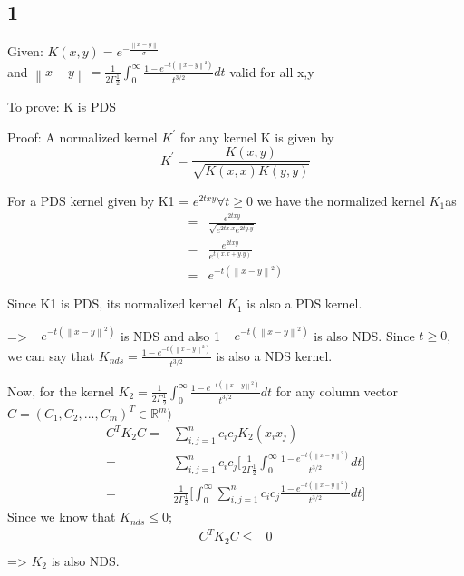 \documentclass{article}
\begin{document}
\subsection*{1}
\begin{description}
  \item{Given:} \( K(x,y) = e^{-\frac{ \left\lVert x - y \right\rVert }{\sigma}} \) \\
    and \( \left\lVert x - y \right\rVert  = \frac{1}{2\Gamma{\frac{1}{2}}} \int_{0}^{\infty} \frac{1 - e^{-t(\left\lVert x - y \right\rVert^{2})} }{ t^{3/2}} dt \) valid for all x,y
  \item{To prove:} K is PDS
  \item{Proof:}
    A normalized kernel $K^{'}$ for any kernel K is given by
    \begin{equation*}
      K^{'} = \frac{K(x,y)}{\sqrt{K(x,x) K(y,y)}}
    \end{equation*}

    For a PDS kernel given by K1 = $e^{2txy} \forall t \ge 0$ we have the normalized kernel $K_{1}$as 
    \begin{align}
      =& \frac{e^{2txy}}{\sqrt{e^{2tx.x}e^{2ty.y}}} \\
      =& \frac{e^{2txy}}{e^{t(x.x + y.y)}} \\
      =& e^{-t(\left\lVert x - y \right\rVert^{2})}
    \end{align}

    Since K1 is PDS, its normalized kernel $K_{1} $ is also a PDS kernel.

    => $-e^{-t(\left\lVert x - y \right\rVert^{2})}$ is NDS and also 1 $-e^{-t(\left\lVert x - y \right\rVert^{2})}$ is also NDS.  Since $ t \ge 0$, we can say that $ K_{nds} = \frac{1 - e^{-t(\left\lVert x - y \right\rVert^{2})}}{t^{3/2}}$ is also a NDS kernel.

    Now, for the kernel $K_{2} = \frac{1}{2\Gamma{\frac{1}{2}}} \int_{0}^{\infty} \frac{1 - e^{-t(\left\lVert x - y \right\rVert^{2})} }{ t^{3/2}} dt$
    for any column vector \( C = (C_{1}, C_{2}, ...  ,C_{m})^{T} \in \mathbb{R}^{m} ) \)
    \begin{align*}
      C^{T}K_{2}C =& \sum_{i,j=1}^{n} c_{i}c_{j} K_{2}(x_{i}x_{j}) \\
      =& \sum_{i,j=1}^{n} c_{i}c_{j} \bigl[ \frac{1}{2\Gamma{\frac{1}{2}}} \int_{0}^{\infty} \frac{1 - e^{-t(\left\lVert x - y \right\rVert^{2})} }{ t^{3/2}} dt \bigr] \\
      =& \frac{1}{2\Gamma{\frac{1}{2}}} \bigl[ \int_{0}^{\infty} \sum_{i,j=1}^{n} c_{i}c_{j} \frac{1 - e^{-t(\left\lVert x - y \right\rVert^{2})} }{ t^{3/2}} dt \bigr] 
    \end{align*}
    Since we know that $K_{nds} \le 0$; 
    \begin{align*}
      C^{T}K_{2}C \le& 0 \\
    \end{align*}
    => $K_{2}$ is also NDS.


\end{description}
\end{document}
